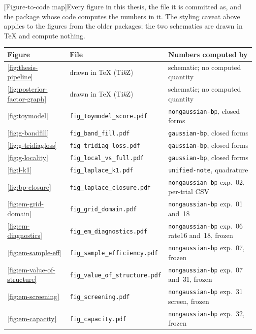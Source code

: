 \begin{center}
\begin{minipage}{\linewidth}\small\centering
{}[Figure-to-code map]{Every figure in this thesis, the file it is committed as, and the package whose code computes the numbers in it. The styling caveat above applies to the figures from the older packages; the two schematics are drawn in \TeX{} and compute nothing.}
\label{tab:figure-map}
\begin{tabular}{@{}lll@{}}
\toprule
Figure & File & Numbers computed by \\
\midrule
\ref{fig:thesis-pipeline} & drawn in \TeX{} (Ti\emph{k}Z) & schematic; no computed quantity \\
\ref{fig:posterior-factor-graph} & drawn in \TeX{} (Ti\emph{k}Z) & schematic; no computed quantity \\
\ref{fig:toymodel} & \texttt{fig\_toymodel\_score.pdf} & \texttt{nongaussian-bp}, closed forms \\
\ref{fig:g-bandfill} & \texttt{fig\_band\_fill.pdf} & \texttt{gaussian-bp}, closed forms \\
\ref{fig:g-tridiagloss} & \texttt{fig\_tridiag\_loss.pdf} & \texttt{gaussian-bp}, closed forms \\
\ref{fig:g-locality} & \texttt{fig\_local\_vs\_full.pdf} & \texttt{gaussian-bp}, closed forms \\
\ref{fig:l-k1} & \texttt{fig\_laplace\_k1.pdf} & \texttt{unified-note}, quadrature \\
\ref{fig:bp-closure} & \texttt{fig\_laplace\_closure.pdf} & \texttt{nongaussian-bp} exp.~02, per-trial CSV \\
\ref{fig:em-grid-domain} & \texttt{fig\_grid\_domain.pdf} & \texttt{nongaussian-bp} exp.~01 and~18 \\
\ref{fig:em-diagnostics} & \texttt{fig\_em\_diagnostics.pdf} & \texttt{nongaussian-bp} exp.~06 rate16 and~18, frozen \\
\ref{fig:em-sample-eff} & \texttt{fig\_sample\_efficiency.pdf} & \texttt{nongaussian-bp} exp.~07, frozen \\
\ref{fig:em-value-of-structure} & \texttt{fig\_value\_of\_structure.pdf} & \texttt{nongaussian-bp} exp.~07 and~31, frozen \\
\ref{fig:em-screening} & \texttt{fig\_screening.pdf} & \texttt{nongaussian-bp} exp.~31 screen, frozen \\
\ref{fig:em-capacity} & \texttt{fig\_capacity.pdf} & \texttt{nongaussian-bp} exp.~32, frozen \\

\end{tabular}
\end{minipage}
\end{center}
